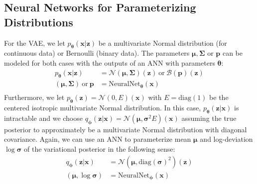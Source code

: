 \documentclass[12pt]{report}
\theoremstyle{definition}
\begin{document}
\subsection{Neural Networks for Parameterizing Distributions}
For the VAE, we let $p_{\pmb{\theta}}(\mathbf{x}|\mathbf{z})$ be a multivariate Normal distribution (for continuous data) or Bernoulli (binary data). The parameters $\pmb{\mu}, \pmb{\Sigma}$ or $\mathbf{p}$ can be modeled for both cases with the outputs of an ANN with parameters $\pmb{\theta}$:
\begin{equation}
\begin{split}
p_{\pmb{\theta}}(\mathbf{x}|\mathbf{z}) & = \mathcal{N}(\pmb{\mu}, \pmb{\Sigma})(\mathbf{z}) \ \mathrm{or} \ \mathcal{B}(\mathbf{p})(\mathbf{z}) \\
(\pmb{\mu}, \pmb{\Sigma}) \ \mathrm{or} \ \mathbf{p} & = \mathrm{NeuralNet}_{\pmb{\theta}}(\mathbf{x}) \\
\end{split}
\end{equation}
Furthermore, we let $p_{\pmb{\theta}}(\mathbf{z})=\mathcal{N}(0, E)(\mathbf{x})$ with $E=\mathrm{diag}(1)$ be the centered isotropic multivariate Normal distribution. In this case,  $p_{\pmb{\theta}}(\mathbf{z}|\mathbf{x})$ is intractable and we choose $q_{\pmb{\phi}}(\mathbf{z}|\mathbf{x})=\mathcal{N}(\pmb{\mu}, \pmb{\sigma}^2 E)(\mathbf{x})$ assuming the true posterior to approximately be a multivariate Normal distribution with diagonal covariance. Again, we can use an ANN to parameterize mean $\pmb{\mu}$ and log-deviation $\log \pmb{\sigma}$ of the variational posterior in the following sense:
\begin{equation}
\begin{split}
q_{\pmb{\phi}}(\mathbf{z}|\mathbf{x}) & = \mathcal{N}(\pmb{\mu}, \mathrm{diag}(\pmb{\sigma})^2)(\mathbf{z}) \\
(\pmb{\mu}, \log \pmb{\sigma}) & = \mathrm{NeuralNet}_{\pmb{\phi}}(\mathbf{x}) \\
\end{split}
\end{equation}
\end{document}
